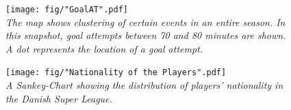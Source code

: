 \documentclass[portrait, a0,30pt]{sciposter}
\begin{document}
\begin{multicols}{2}
\begin{mdframed}[skipabove=0.7056cm]
\begin{figure}
	\center
	\texttt{[image: fig/"GoalAT".pdf]}
	\label{Fig:viz}
	\\
	\textit{The map shows clustering of certain events in an entire season. In this snapshot, goal attempts between 70 and 80 minutes are shown. A dot represents the location of a goal attempt.}
\end{figure}
\end{mdframed}

\begin{mdframed}[skipabove=0.7056cm]
\begin{figure}
\center
\texttt{[image: fig/"Nationality of the Players".pdf]}
\label{Fig:Nationality}
\\\textit{A Sankey-Chart showing the distribution of players' nationality in the Danish Super League.
}
\end{figure}
\end{mdframed}
\end{multicols}
\end{document}
